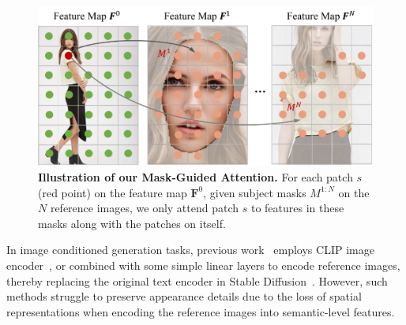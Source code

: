 \begin{figure}[!t]
\centering
\includegraphics[width=\linewidth]{figure/mask_guided.pdf}
\caption{\textbf{Illustration of our Mask-Guided Attention.} For each patch $s$ (red point) on the feature map $\bm{F}^{0}$, given subject masks $M^{1:N}$ on the $N$ reference images, we only attend patch $s$ to features in these masks along with the patches on itself.}
\label{fig:mask_guided}
\end{figure}

 In image conditioned generation tasks, previous work~\cite{ye2023ipadapter,yang2023paintbyexample,zhang2024ssrencoder} employs CLIP image encoder~\cite{radford2021clip}, or combined with some simple linear layers to encode reference images, thereby replacing the original text encoder in Stable Diffusion~\cite{rombach2022ldm}. However, such methods struggle to preserve appearance details due to the loss of spatial representations when encoding the reference images into semantic-level features.

